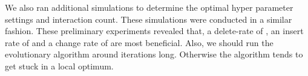 \documentclass[./../../paper.tex]{subfiles}
\begin{document}
We also ran additional simulations to determine the optimal hyper parameter settings and interaction count. These simulations were conducted in a similar fashion. These preliminary experiments revealed that, a delete-rate of , an insert rate of  and a change rate of  are most beneficial. Also, we should run the evolutionary algorithm around  iterations long. Otherwise the algorithm tends to get stuck in a local optimum.
\end{document}
